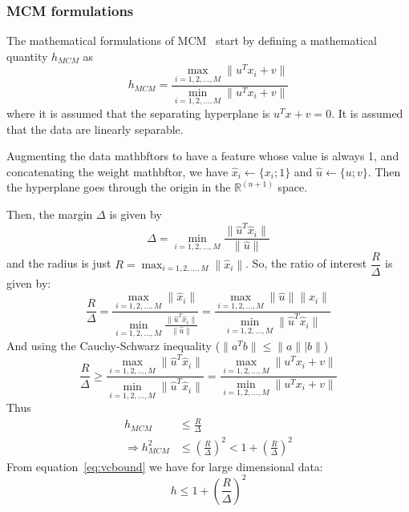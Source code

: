 \documentclass[11pt]{article}
\begin{document}
\subsubsection{MCM formulations}
The mathematical formulations of MCM~\cite{MCM} start by defining a
mathematical quantity $h_{MCM}$ as
\begin{equation}
    h_{MCM}=\frac{\max_{i=1,2,\dotsc,M}\lVert u^Tx_i+v\rVert}{\min_{i=1,2,\dotsc,M}\lVert u^Tx_i+v\rVert}
\end{equation}
where it is assumed that the separating hyperplane is $u^Tx+v=0$. It is assumed
that the data are linearly separable.\par
Augmenting the data mathbftors to have a feature whose value is always 1, and
concatenating the weight mathbftor, we have $\hat{x}_i\gets\{x_i;1\}$ and
$\hat{u}\gets \{u;v\}$. Then the hyperplane goes through the origin in the
$\mathbb{R}^{(n+1)}$ space.\par
Then, the margin $\Delta$ is given by
\begin{equation}
    \Delta=\min_{i=1,2,\dotsc,M}\frac{\lVert\hat{u}^T\hat{x}_i\rVert}{\lVert\hat{u}\rVert}
\end{equation}
and the radius is just $R=\max_{i=1,2,\dotsc,M}\lVert\hat{x}_i\rVert$. So, the
ratio of interest $\dfrac{R}{\Delta}$ is given by:
\begin{equation}
    \frac{R}{\Delta}=\frac{\max_{i=1,2,\dotsc,M}\lVert\hat{x}_i\rVert}{\min_{i=1,2,\dotsc,M}\frac{\lVert\hat{u}^T\hat{x}_i\rVert}{\lVert\hat{u}\rVert}}=\frac{\max_{i=1,2,\dotsc,M}\lVert\hat{u}\rVert\lVert\hat{x}_i\rVert}{\min_{i=1,2,\dotsc,M}\lVert\hat{u}^T\hat{x}_i\rVert}
\end{equation}
And using the Cauchy-Schwarz inequality ($\lVert a^Tb\rVert\le\lVert
a\rVert\lvert b\rVert$)
\begin{equation}
    \frac{R}{\Delta}\ge\frac{\max_{i=1,2,\dotsc,M}\lVert\hat{u}^T\hat{x}_i\rVert}{\min_{i=1,2,\dotsc,M}\lVert\hat{u}^T\hat{x}_i\rVert}=\frac{\max_{i=1,2,\dotsc,M}\lVert u^Tx_i+v\rVert}{\min_{i=1,2,\dotsc,M}\lVert
    u^Tx_i+v\rVert}
\end{equation}
Thus
\begin{align}
    h_{MCM}&\le\frac{R}{\Delta}\\
    \Rightarrow
    h_{MCM}^2&\le\left(\frac{R}{\Delta}\right)^2<1+\left(\frac{R}{\Delta}\right)^2
\end{align}
From equation~\ref{eq:vcbound} we have for large dimensional data:
\begin{equation}
    h\le 1+\left(\frac{R}{\Delta}\right)^2
\end{equation}
\end{document}
